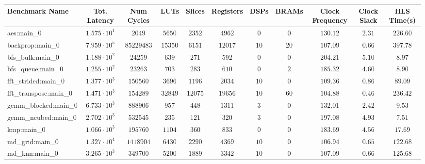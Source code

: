 \begin{tabular}{|l|c|c|c|c|c|c|c|c|c|c|}
\hline
Benchmark Name         & Tot. Latency           & Num Cycles   & LUTs      & Slices    & Registers & DSPs    & BRAMs  & Clock Frequency & Clock Slack & HLS Time(s) \\
\hline
aes:main\_0            & $ 1.575 \cdot 10^{1} $ & $ 2049     $ & $ 5650  $ & $ 2352  $ & $ 4962  $ & $ 0   $ & $ 0  $ & $ 130.12      $ & $ 2.31    $ & $ 226.60  $ \\
backprop:main\_0       & $ 7.959 \cdot 10^{5} $ & $ 85229483 $ & $ 15350 $ & $ 6151  $ & $ 12017 $ & $ 10  $ & $ 20 $ & $ 107.09      $ & $ 0.66    $ & $ 397.78  $ \\
bfs\_bulk:main\_0      & $ 1.188 \cdot 10^{2} $ & $ 24259    $ & $ 639   $ & $ 271   $ & $ 592   $ & $ 0   $ & $ 0  $ & $ 204.21      $ & $ 5.10    $ & $ 8.97    $ \\
bfs\_queue:main\_0     & $ 1.255 \cdot 10^{2} $ & $ 23263    $ & $ 703   $ & $ 283   $ & $ 610   $ & $ 0   $ & $ 2  $ & $ 185.32      $ & $ 4.60    $ & $ 8.90    $ \\
fft\_strided:main\_0   & $ 1.377 \cdot 10^{3} $ & $ 150560   $ & $ 3696  $ & $ 1196  $ & $ 2034  $ & $ 10  $ & $ 0  $ & $ 109.36      $ & $ 0.86    $ & $ 89.09   $ \\
fft\_transpose:main\_0 & $ 1.471 \cdot 10^{3} $ & $ 154289   $ & $ 32849 $ & $ 12075 $ & $ 19656 $ & $ 10  $ & $ 60 $ & $ 104.88      $ & $ 0.46    $ & $ 236.42  $ \\
gemm\_blocked:main\_0  & $ 6.733 \cdot 10^{3} $ & $ 888906   $ & $ 957   $ & $ 448   $ & $ 1311  $ & $ 3   $ & $ 0  $ & $ 132.01      $ & $ 2.42    $ & $ 9.53    $ \\
gemm\_ncubed:main\_0   & $ 2.702 \cdot 10^{3} $ & $ 532545   $ & $ 235   $ & $ 121   $ & $ 320   $ & $ 3   $ & $ 0  $ & $ 197.08      $ & $ 4.93    $ & $ 7.51    $ \\
kmp:main\_0            & $ 1.066 \cdot 10^{3} $ & $ 195760   $ & $ 1104  $ & $ 360   $ & $ 833   $ & $ 0   $ & $ 0  $ & $ 183.69      $ & $ 4.56    $ & $ 17.69   $ \\
md\_grid:main\_0       & $ 1.327 \cdot 10^{4} $ & $ 1418904  $ & $ 6430  $ & $ 2290  $ & $ 4369  $ & $ 10  $ & $ 0  $ & $ 106.94      $ & $ 0.65    $ & $ 122.68  $ \\
md\_knn:main\_0        & $ 3.265 \cdot 10^{3} $ & $ 349700   $ & $ 5200  $ & $ 1889  $ & $ 3342  $ & $ 10  $ & $ 0  $ & $ 107.09      $ & $ 0.66    $ & $ 125.68  $ \\

\end{tabular}
